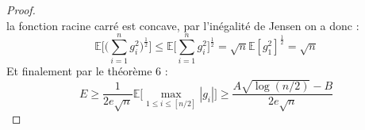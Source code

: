 \documentclass{report}
\begin{document}
\begin{proof}
\begin{equation*}
	\end{equation*}
	la fonction racine carré est concave, par l'inégalité de Jensen on a donc :
	\begin{equation*}
		\mathbb{E}\big[\big(\sum_{i=1}^{n}g_i^2\big)^{\frac{1}{2}}\big]\leq \mathbb{E}\big[\sum_{i=1}^{n}g_i^2\big]^{\frac{1}{2}}= \sqrt{n} \mathbb{E}[g_1^2]^{\frac{1}{2}}=\sqrt{n} 
	\end{equation*}
	\color{blue}
	Et finalement par le théorème 6 :
	\begin{equation*}
		E\geq \frac{1}{2e\sqrt{n}} \mathbb{E}\big[\max_{1\leq i \leq [n/2]}|g_i|\big]\geq \frac{A\sqrt{\log(n/2)}-B}{2e\sqrt{n}}
	\end{equation*}
	\color{black}
\end{proof}
\end{document}

